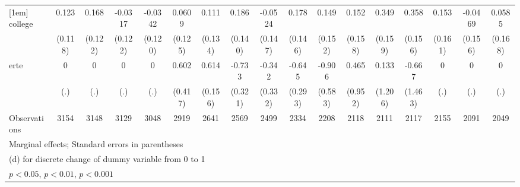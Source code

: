 {\begin{tabular}{l*{16}{c}}
[1em]
college             &       0.123         &       0.168         &     -0.0317         &     -0.0342         &      0.0609         &       0.111         &       0.186         &     -0.0524         &       0.178         &       0.149         &       0.152         &       0.349\sym{*}  &       0.358\sym{*}  &       0.153         &     -0.0469         &      0.0585         \\
                    &     (0.118)         &     (0.122)         &     (0.122)         &     (0.120)         &     (0.125)         &     (0.134)         &     (0.140)         &     (0.147)         &     (0.146)         &     (0.152)         &     (0.158)         &     (0.159)         &     (0.156)         &     (0.161)         &     (0.156)         &     (0.168)         \\
[1em]
erte                &           0         &           0         &           0         &           0         &       0.602         &       0.614\sym{***}&      -0.733\sym{*}  &      -0.342         &      -0.645\sym{*}  &      -0.906         &       0.465         &       0.133         &      -0.667         &           0         &           0         &           0         \\
                    &         (.)         &         (.)         &         (.)         &         (.)         &     (0.417)         &     (0.156)         &     (0.321)         &     (0.332)         &     (0.293)         &     (0.583)         &     (0.952)         &     (1.206)         &     (1.463)         &         (.)         &         (.)         &         (.)         \\
\hline
Observations        &        3154         &        3148         &        3129         &        3048         &        2919         &        2641         &        2569         &        2499         &        2334         &        2208         &        2118         &        2111         &        2117         &        2155         &        2091         &        2049         \\
\hline\hline
\multicolumn{17}{l}{\footnotesize Marginal effects; Standard errors in parentheses}\\
\multicolumn{17}{l}{\footnotesize  (d) for discrete change of dummy variable from 0 to 1}\\
\multicolumn{17}{l}{\footnotesize \sym{*} \(p<0.05\), \sym{**} \(p<0.01\), \sym{***} \(p<0.001\)}\\
\end{tabular}
}
